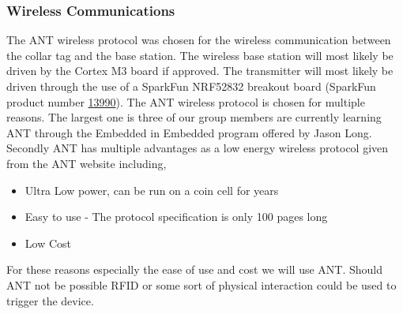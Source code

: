 \documentclass[titlepage]{article}
\begin{document}
    \subsubsection{Wireless Communications}
    The ANT wireless protocol was chosen for the wireless communication
    between the collar tag and the base station. The wireless base
    station will most likely be driven by the Cortex M3 board if
    approved. The transmitter will most likely be driven through the use
    of a SparkFun NRF52832 breakout board (SparkFun product number
    \href{https://www.sparkfun.com/products/13990}{13990}).
    The ANT wireless protocol is chosen for multiple reasons. The
    largest one is three of our group members are currently learning
    ANT through the Embedded in Embedded program offered by Jason Long.
    Secondly ANT has multiple advantages as a low energy wireless
    protocol given from the ANT website \cite{ant_site} including,
    \begin{itemize}
        \item Ultra Low power, can be run on a coin cell for years
        \item Easy to use - The protocol specification is only 100 pages
            long
        \item Low Cost
    \end{itemize}
    For these reasons especially the ease of use and cost we will use
    ANT. Should ANT not be possible RFID or some sort of physical
    interaction could be used to trigger the device.

    \appendix

    
    

    

    
    
\end{document}
